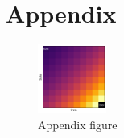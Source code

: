 \chapter*{Appendix}

\pagestyle{plain}

\renewcommand{\thefigure}{A\arabic{figure}}
\setcounter{figure}{0}

\begin{figure}[htb]
    \centering
    \includegraphics[width=0.2\textwidth]{assets/2d.png}
    \caption{Appendix figure}
    \label{fig:appendix}
\end{figure}
